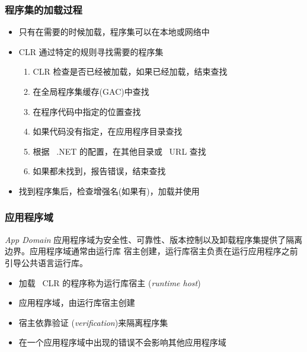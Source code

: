 \begin{frame}
\frametitle{程序集的加载过程}
\begin{itemize}
  \setlength{\itemsep}{8pt plus 1pt}
\item 只有在需要的时候加载，程序集可以在本地或网络中

\item CLR 通过特定的规则寻找需要的程序集

  \begin{enumerate}
    \setlength{\itemsep}{4pt plus 1pt}
  \item CLR 检查是否已经被加载，如果已经加载，结束查找
  \item 在全局程序集缓存(GAC)中查找
  \item 在程序代码中指定的位置查找
  \item 如果代码没有指定，在应用程序目录查找
  \item 根据 ~.NET 的配置，在其他目录或 ~URL 查找
  \item 如果都未找到，报告错误，结束查找
  \end{enumerate}

\item 找到程序集后，检查增强名(如果有)，加载并使用
\end{itemize}
\end{frame}


\begin{frame}
\frametitle{应用程序域}
\begin{block}{\textit{App Domain}}
  \CJKindent 应用程序域为安全性、可靠性、版本控制以及卸载程序集提供了隔离边界。应用程序域通常由运行库
  宿主创建，运行库宿主负责在运行应用程序之前引导公共语言运行库。
\end{block}
\pause
\begin{itemize}
\item 加载 ~CLR 的程序称为{运行库宿主} (\textit{runtime host})
\item 应用程序域，由运行库宿主创建
\item 宿主依靠{验证} (\textit{verification})来隔离程序集
\item 在一个应用程序域中出现的错误不会影响其他应用程序域
\end{itemize}
\end{frame}

